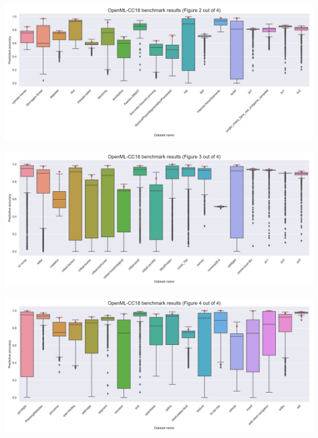 \documentclass[a0paper,portrait]{baposter}
\begin{document}
\begin{poster}
{\begin{minipage}{.5\textwidth}
\end{minipage}%
\begin{minipage}{.5\textwidth}
  \centering
  \includegraphics[width=0.9\linewidth]{../img/openml-boxplot1-hdpi.png}

\end{minipage}

\vspace{0.5em}

\begin{minipage}{.5\textwidth}
  \centering
  \includegraphics[width=0.9\linewidth]{../img/openml-boxplot2-hdpi.png}

\end{minipage}%
\begin{minipage}{.5\textwidth}
  \centering
  \includegraphics[width=0.9\linewidth]{../img/openml-boxplot3-hdpi.png}

\end{minipage}
}


\end{poster}
\end{document}
